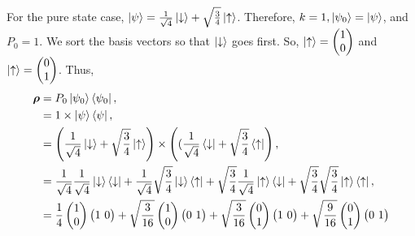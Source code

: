\documentclass{article}
\begin{document}
For the pure state case, $\ket{\psi}=\frac{1}{\sqrt{4}}\ket{\downarrow}+\sqrt{\frac{3}{4}}\ket{\uparrow}$.
Therefore, $k=1, \ket{\psi_0}=\ket{\psi}$, and $P_0=1$. We sort the basis
vectors so that $\ket{\downarrow}$ goes first. So, $\ket{\uparrow}=\begin{pmatrix}
    1\\0
\end{pmatrix}$ and $\ket{\uparrow}=\begin{pmatrix}
    0\\1
\end{pmatrix}$. Thus,
\begin{align*} \label{eq 6.19}
    \boldsymbol{\rho}&=P_0\ket{\psi_0}\bra{\psi_0},\\
    &=1 \times \ket{\psi}\bra{\psi},\\
    &=\left( \frac{1}{\sqrt{4}}\ket{\downarrow}+\sqrt{\frac{3}{4}}\ket{\uparrow} \right) \times\left((\frac{1}{\sqrt{4}}\bra{\downarrow}+\sqrt{\frac{3}{4}}\bra{\uparrow}\right),\\
    &=\frac{1}{\sqrt{4}}\frac{1}{\sqrt{4}}\ket{\downarrow}\bra{\downarrow}+\frac{1}{\sqrt{4}}\sqrt{\frac{3}{4}}\ket{\downarrow}\bra{\uparrow}+
    \sqrt{\frac{3}{4}}\frac{1}{\sqrt{4}}\ket{\uparrow}\bra{\downarrow}+\sqrt{\frac{3}{4}}\sqrt{\frac{3}{4}}\ket{\uparrow}\bra{\uparrow},\\
    &=\frac{1}{4}\begin{pmatrix}
        1\\0
    \end{pmatrix}
    \begin{pmatrix}
    1 \ 0    
    \end{pmatrix}+
    \sqrt{\frac{3}{16}}\begin{pmatrix}
        1\\0
    \end{pmatrix}
    \begin{pmatrix}
        0 \ 1
    \end{pmatrix}+
    \sqrt{\frac{3}{16}}\begin{pmatrix}
        0\\1
    \end{pmatrix}
    \begin{pmatrix}
        1 \ 0
    \end{pmatrix}+
    \sqrt{\frac{9}{16}}\begin{pmatrix}
        0\\1
    \end{pmatrix}
    \begin{pmatrix}
        0 \ 1

\end{pmatrix}
\end{align*}
\end{document}
